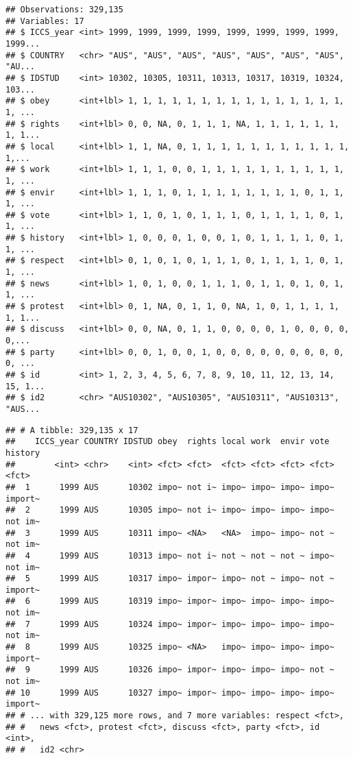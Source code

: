 \documentclass[]{article}
\newenvironment{Shaded}{\begin{snugshade}}{\end{snugshade}}
\newcommand{\CommentTok}[1]{\textcolor[rgb]{0.56,0.35,0.01}{\textit{#1}}}
\newcommand{\KeywordTok}[1]{\textcolor[rgb]{0.13,0.29,0.53}{\textbf{#1}}}
\newcommand{\NormalTok}[1]{#1}
\newcommand{\OperatorTok}[1]{\textcolor[rgb]{0.81,0.36,0.00}{\textbf{#1}}}
\newcommand{\StringTok}[1]{\textcolor[rgb]{0.31,0.60,0.02}{#1}}
\begin{document}
\begin{verbatim}
## Observations: 329,135
## Variables: 17
## $ ICCS_year <int> 1999, 1999, 1999, 1999, 1999, 1999, 1999, 1999, 1999...
## $ COUNTRY   <chr> "AUS", "AUS", "AUS", "AUS", "AUS", "AUS", "AUS", "AU...
## $ IDSTUD    <int> 10302, 10305, 10311, 10313, 10317, 10319, 10324, 103...
## $ obey      <int+lbl> 1, 1, 1, 1, 1, 1, 1, 1, 1, 1, 1, 1, 1, 1, 1, 1, ...
## $ rights    <int+lbl> 0, 0, NA, 0, 1, 1, 1, NA, 1, 1, 1, 1, 1, 1, 1, 1...
## $ local     <int+lbl> 1, 1, NA, 0, 1, 1, 1, 1, 1, 1, 1, 1, 1, 1, 1, 1,...
## $ work      <int+lbl> 1, 1, 1, 0, 0, 1, 1, 1, 1, 1, 1, 1, 1, 1, 1, 1, ...
## $ envir     <int+lbl> 1, 1, 1, 0, 1, 1, 1, 1, 1, 1, 1, 1, 0, 1, 1, 1, ...
## $ vote      <int+lbl> 1, 1, 0, 1, 0, 1, 1, 1, 0, 1, 1, 1, 1, 0, 1, 1, ...
## $ history   <int+lbl> 1, 0, 0, 0, 1, 0, 0, 1, 0, 1, 1, 1, 1, 0, 1, 1, ...
## $ respect   <int+lbl> 0, 1, 0, 1, 0, 1, 1, 1, 0, 1, 1, 1, 1, 0, 1, 1, ...
## $ news      <int+lbl> 1, 0, 1, 0, 0, 1, 1, 1, 0, 1, 1, 0, 1, 0, 1, 1, ...
## $ protest   <int+lbl> 0, 1, NA, 0, 1, 1, 0, NA, 1, 0, 1, 1, 1, 1, 1, 1...
## $ discuss   <int+lbl> 0, 0, NA, 0, 1, 1, 0, 0, 0, 0, 1, 0, 0, 0, 0, 0,...
## $ party     <int+lbl> 0, 0, 1, 0, 0, 1, 0, 0, 0, 0, 0, 0, 0, 0, 0, 0, ...
## $ id        <int> 1, 2, 3, 4, 5, 6, 7, 8, 9, 10, 11, 12, 13, 14, 15, 1...
## $ id2       <chr> "AUS10302", "AUS10305", "AUS10311", "AUS10313", "AUS...
\end{verbatim}

\begin{Shaded}
\end{Shaded}

\begin{verbatim}
## # A tibble: 329,135 x 17
##    ICCS_year COUNTRY IDSTUD obey  rights local work  envir vote  history
##        <int> <chr>    <int> <fct> <fct>  <fct> <fct> <fct> <fct> <fct>  
##  1      1999 AUS      10302 impo~ not i~ impo~ impo~ impo~ impo~ import~
##  2      1999 AUS      10305 impo~ not i~ impo~ impo~ impo~ impo~ not im~
##  3      1999 AUS      10311 impo~ <NA>   <NA>  impo~ impo~ not ~ not im~
##  4      1999 AUS      10313 impo~ not i~ not ~ not ~ not ~ impo~ not im~
##  5      1999 AUS      10317 impo~ impor~ impo~ not ~ impo~ not ~ import~
##  6      1999 AUS      10319 impo~ impor~ impo~ impo~ impo~ impo~ not im~
##  7      1999 AUS      10324 impo~ impor~ impo~ impo~ impo~ impo~ not im~
##  8      1999 AUS      10325 impo~ <NA>   impo~ impo~ impo~ impo~ import~
##  9      1999 AUS      10326 impo~ impor~ impo~ impo~ impo~ not ~ not im~
## 10      1999 AUS      10327 impo~ impor~ impo~ impo~ impo~ impo~ import~
## # ... with 329,125 more rows, and 7 more variables: respect <fct>,
## #   news <fct>, protest <fct>, discuss <fct>, party <fct>, id <int>,
## #   id2 <chr>
\end{verbatim}
\end{document}
